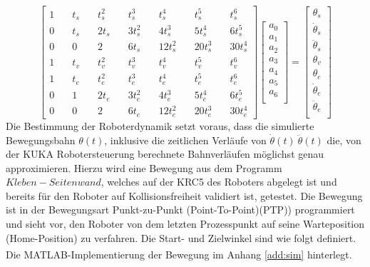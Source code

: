 \begin{equation}
	\label{eqn:lgs}
	\left[	\begin{matrix}
		1&\quad    t_s&\quad          	t_s^2&\quad              	t_s^3&\quad         	t_s^4&\quad              	t_s^5&\quad          	t_s^6\\
		0&\quad    t_s&\quad          	2t_s&\quad              	3t_s^2&\quad        	4t_s^3&\quad            	5t_s^4&\quad        	6t_s^5\\
		0&\quad    0&\quad         		2&\quad              	  	6t_s&\quad         	 	12t_s^2&\quad           	20t_s^3&\quad       	30t_s^4\\
		1&\quad    t_v&\quad         	t_v^2&\quad              	t_v^3&\quad         	t_v^4&\quad             	t_v^5&\quad          	t_v^6\\
		1&\quad    t_e&\quad        	t_e^2&\quad              	t_e^3&\quad          	t_e^4&\quad             	t_e^5&\quad          	t_e^6\\
		0&\quad    1&\quad   	   		2t_e&\quad              	3t_e^2&\quad        	4t_e^3&\quad           		5t_e^4&\quad        	6t_e^5\\   
		0&\quad    0&\quad          	2&\quad                 	6t_e&\quad          	12t_e^2&\quad           	20t_e^3&\quad       	30t_e^4
	\end{matrix}\right]
	\left[	\begin{matrix}
		a_0\\
		a_1\\
		a_2\\
		a_3\\
		a_4\\
		a_5\\
		a_6\\		
	\end{matrix}\right] = 
		\left[	\begin{matrix}
		\theta_s\\
		\dot{\theta}_s\\
		\ddot{\theta}_s\\
		\theta_v\\
		\theta_e\\
		\dot{\theta}_e\\
		\ddot{\theta}_e\\		
	\end{matrix}\right]
\end{equation}
%
Die Bestimmung der Roboterdynamik setzt voraus, dass die simulierte Bewegungsbahn $\theta(t)$, inklusive die zeitlichen Verläufe von $\dot{\theta}(t) ~\ddot{\theta}(t)$  die, von der KUKA Robotersteuerung berechnete Bahnverläufen möglichst genau approximieren. Hierzu wird eine Bewegung aus dem Programm $Kleben-Seitenwand$, welches auf der KRC5 des Roboters abgelegt ist und bereits für den Roboter auf Kollisionsfreiheit validiert ist, getestet. Die Bewegung ist in der Bewegungsart  Punkt-zu-Punkt (Point-To-Point)(PTP)) programmiert und sieht vor, den Roboter von dem letzten Prozesspunkt auf seine Warteposition (Home-Position) zu verfahren. Die Start- und Zielwinkel sind wie folgt definiert. Die MATLAB\textsuperscript{\textregistered}-Implementierung der Bewegung im Anhang \ref{add:sim} hinterlegt.
